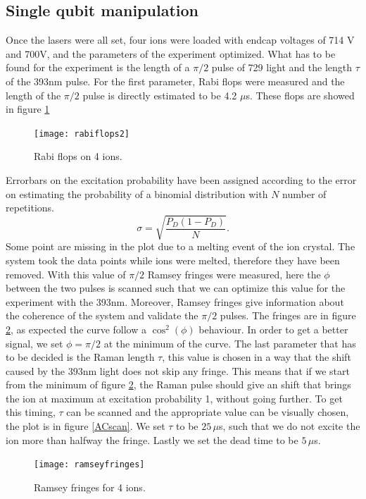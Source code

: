 \subsection{Single qubit manipulation}
\label{sec:singlequbitmanipulation}
Once the lasers were all set, four ions were loaded with endcap voltages of 714 V and 700V, and the parameters of the experiment optimized. What has to be found for the experiment is the length of a $\pi/2$ pulse of 729 light and the length $\tau$ of the 393nm pulse. For the first parameter, Rabi flops were measured and the length of the $\pi/2$ pulse is directly estimated to be 4.2 $\mu$s. These flops are showed in figure \ref{rabiflops4}
\begin{figure}[H]
\centering
\texttt{[image: rabiflops2]}
\caption{Rabi flops on 4 ions.}
\label{rabiflops4}
\end{figure}
Errorbars on the excitation probability have been assigned according to the error on estimating the probability of a binomial distribution with $N$ number of repetitions.
\begin{equation}
\sigma = \sqrt{\frac{P_{D}(1-P_{D})}{N}}.
\end{equation}
Some point are missing in the plot due to a melting event of the ion crystal. The system took the data points while ions were melted, therefore they have been removed. With this value of $\pi/2$ Ramsey fringes were measured, here the $\phi$ between the two pulses is scanned such that we can optimize this value for the experiment with the 393nm. Moreover, Ramsey fringes give information about the coherence of the system and validate the $\pi/2$ pulses.
The fringes are in figure \ref{ramseyfringes}, as expected the curve follow a $\cos^2(\phi)$ behaviour. In order to get a better signal, we set $\phi = \pi/2$ at the minimum of the curve. The last parameter that has to be decided is the Raman length $\tau$, this value is chosen in a way that the shift caused by the 393nm light does not skip any fringe. This means that if we start from the minimum of figure \ref{ramseyfringes}, the Raman pulse should give an shift that brings the ion at maximum at excitation probability 1, without going further. To get this timing, $\tau$ can be scanned and the appropriate value can be visually chosen, the plot is in figure \ref{ACscan}. We set $\tau$ to be $25\,\mu$s, such that we do not excite the ion more than halfway the fringe. Lastly we set the dead time to be $5\,\mu$s.
\begin{figure}[H]
\centering
\texttt{[image: ramseyfringes]}
\caption{Ramsey fringes for 4 ions.}
\label{ramseyfringes}
\end{figure}

